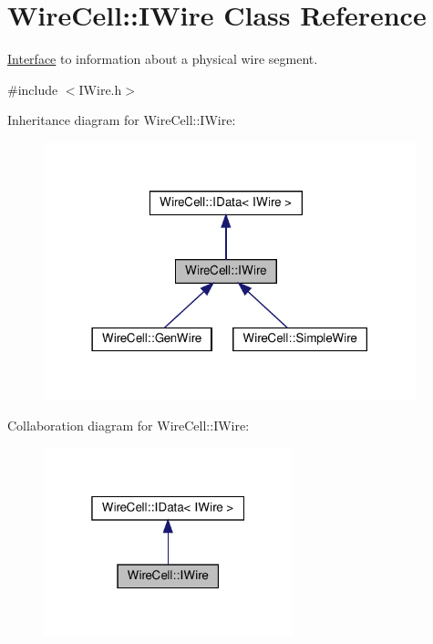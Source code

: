 \hypertarget{class_wire_cell_1_1_i_wire}{}\section{Wire\+Cell\+:\+:I\+Wire Class Reference}
\label{class_wire_cell_1_1_i_wire}


\hyperlink{class_wire_cell_1_1_interface}{Interface} to information about a physical wire segment.  




{\ttfamily \#include $<$I\+Wire.\+h$>$}



Inheritance diagram for Wire\+Cell\+:\+:I\+Wire\+:
\nopagebreak
\begin{figure}[H]
\begin{center}
\leavevmode
\includegraphics[width=306pt]{class_wire_cell_1_1_i_wire__inherit__graph}
\end{center}
\end{figure}


Collaboration diagram for Wire\+Cell\+:\+:I\+Wire\+:
\nopagebreak
\begin{figure}[H]
\begin{center}
\leavevmode
\includegraphics[width=205pt]{class_wire_cell_1_1_i_wire__coll__graph}
\end{center}
\end{figure}
